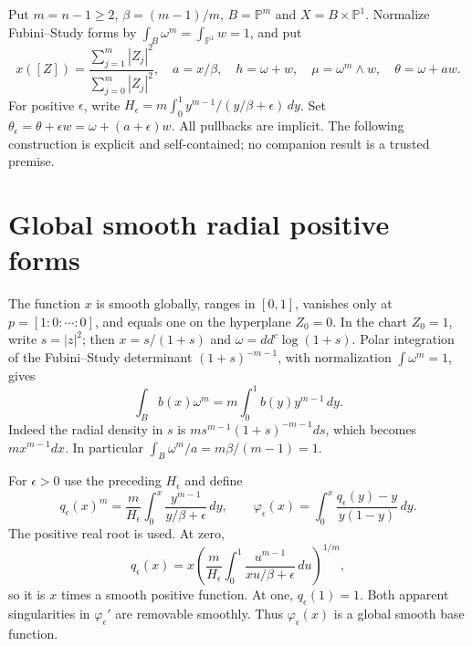 \documentclass[11pt]{article}
\newcommand{\ddc}{dd^c}
\theoremstyle{remark}\newtheorem{remark}[theorem]{Remark}
\begin{document}
Put $m=n-1\geq2$, $\beta=(m-1)/m$, $B=\mathbb P^m$ and
$X=B\times\mathbb P^1$. Normalize Fubini--Study forms by
$\int_B\omega^m=\int_{\mathbb P^1}w=1$, and put
\[
 x([Z])=\frac{\sum_{j=1}^m|Z_j|^2}{\sum_{j=0}^m|Z_j|^2},
 \quad a=x/\beta,\quad h=\omega+w,\quad\mu=\omega^m\wedge w,
 \quad\theta=\omega+a w.
\]
For positive $\epsilon$, write
$H_\epsilon=m\int_0^1y^{m-1}/(y/\beta+\epsilon)\,dy$.
Set $\theta_\epsilon=\theta+\epsilon w=\omega+(a+\epsilon)w$.
All pullbacks are implicit. The following construction is explicit and
self-contained; no companion result is a trusted premise.

\section{Global smooth radial positive forms}
The function $x$ is smooth globally, ranges in $[0,1]$, vanishes only at
$p=[1:0:\cdots:0]$, and equals one on the hyperplane $Z_0=0$.
In the chart $Z_0=1$, write $s=|z|^2$; then $x=s/(1+s)$ and
$\omega=\ddc\log(1+s)$.
Polar integration of the Fubini--Study determinant $(1+s)^{-m-1}$,
with normalization $\int\omega^m=1$, gives
\begin{equation}\label{eq:radial}
 \int_B b(x)\omega^m=m\int_0^1 b(y)y^{m-1}\,dy.
\end{equation}
Indeed the radial density in $s$ is
$m s^{m-1}(1+s)^{-m-1}ds$, which becomes $m x^{m-1}dx$.
In particular $\int_B\omega^m/a=m\beta/(m-1)=1$.

For $\epsilon>0$ use the preceding $H_\epsilon$ and define
\begin{equation}\label{eq:flux}
 q_\epsilon(x)^m=\frac{m}{H_\epsilon}
 \int_0^x\frac{y^{m-1}}{y/\beta+\epsilon}\,dy,
 \qquad
 \varphi_\epsilon(x)=\int_0^x
 \frac{q_\epsilon(y)-y}{y(1-y)}\,dy.
\end{equation}
The positive real root is used. At zero,
\[
 q_\epsilon(x)=x\left(\frac{m}{H_\epsilon}
 \int_0^1\frac{u^{m-1}}{xu/\beta+\epsilon}\,du\right)^{1/m},
\]
so it is $x$ times a smooth positive function. At one,
$q_\epsilon(1)=1$. Both apparent singularities in
$\varphi_\epsilon'$ are removable smoothly. Thus
$\varphi_\epsilon(x)$ is a global smooth base function.
\end{document}
